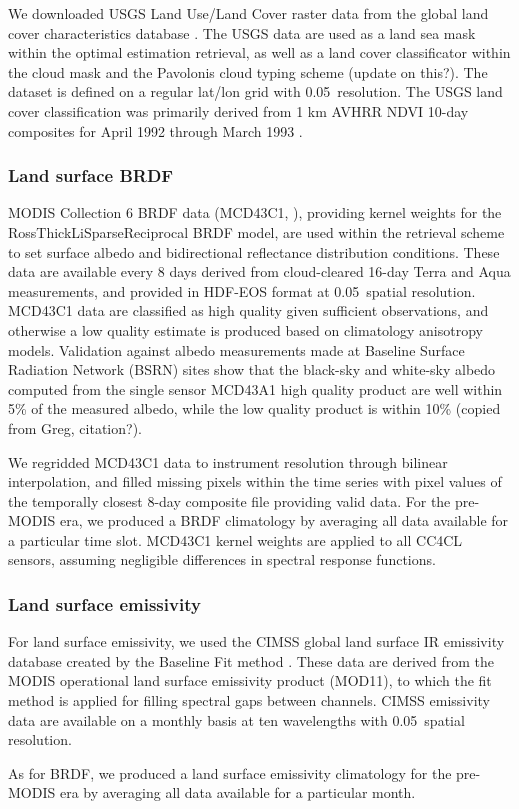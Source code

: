 We downloaded USGS Land Use/Land Cover raster data from the global land cover characteristics database \citep{USGS}. The USGS data are used as a land sea mask within the optimal estimation retrieval, as well as a land cover classificator within the cloud mask and the Pavolonis cloud typing scheme (update on this?). The dataset is defined on a regular lat/lon grid with 0.05\textdegree\ resolution. The USGS land cover classification was primarily derived from 1 km AVHRR NDVI 10-day composites for April 1992 through March 1993 \citep{USGS}. 

\subsubsection{Land surface BRDF}\label{sec:BRDF}

MODIS Collection 6 BRDF data (MCD43C1, \citet{MODIS_BRDF}), providing kernel weights for the RossThickLiSparseReciprocal BRDF model, are used within the retrieval scheme to set surface albedo and bidirectional reflectance distribution conditions. These data are available every 8 days derived from cloud-cleared 16-day Terra and Aqua measurements, and provided in HDF-EOS format at 0.05\textdegree\ spatial resolution. MCD43C1 data are classified as high quality given sufficient observations, and otherwise a low quality estimate is produced based on climatology anisotropy models. Validation against albedo measurements made at Baseline Surface Radiation Network (BSRN) sites show that the black-sky and white-sky albedo computed from the single sensor MCD43A1 high quality product are well within 5\% of the measured albedo, while the low quality product is within 10\% (copied from Greg, citation?).

We regridded MCD43C1 data to instrument resolution through bilinear interpolation, and filled missing pixels within the time series with pixel values of the temporally closest 8-day composite file providing valid data. For the pre-MODIS era, we produced a BRDF climatology by averaging all data available for a particular time slot. MCD43C1 kernel weights are applied to all CC4CL sensors, assuming negligible differences in spectral response functions. 

\subsubsection{Land surface emissivity}\label{sec:emissivity}

For land surface emissivity, we used the CIMSS global land surface IR emissivity database created by the Baseline Fit method \citep{Seemann08}. These data are derived from the MODIS operational land surface emissivity product (MOD11), to which the fit method is applied for filling spectral gaps between channels. CIMSS emissivity data are available on a monthly basis at ten wavelengths with 0.05\textdegree\ spatial resolution.

As for BRDF, we produced a land surface emissivity climatology for the pre-MODIS era by averaging all data available for a particular month.


